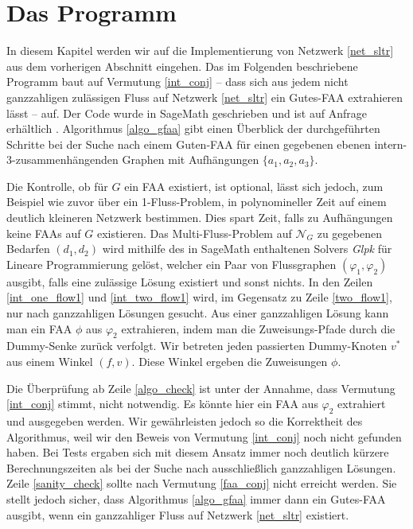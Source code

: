 \chapter{Das Programm}\label{the_program}

In diesem Kapitel werden wir auf die Implementierung von Netzwerk \ref{net_sltr} aus dem vorherigen Abschnitt eingehen. Das im Folgenden beschriebene Programm baut auf Vermutung \ref{int_conj} -- dass sich aus jedem nicht ganzzahligen zulässigen Fluss auf Netzwerk \ref{net_sltr} ein Gutes-FAA extrahieren lässt -- auf. Der Code wurde in SageMath geschrieben und ist auf Anfrage erhältlich \cite{sage}. Algorithmus \ref{algo_gfaa} gibt einen Überblick der durchgeführten Schritte bei der Suche nach einem Guten-FAA für einen gegebenen ebenen intern-3-zusammenhängenden Graphen mit Aufhängungen $\{a_1,a_2,a_3\}$.



Die Kontrolle, ob für $G$ ein FAA existiert, ist optional, lässt sich jedoch, zum Beispiel wie zuvor über ein 1-Fluss-Problem, in polynomineller Zeit auf einem deutlich kleineren Netzwerk bestimmen. Dies spart Zeit, falls zu Aufhängungen keine FAAs auf $G$ existieren. Das Multi-Fluss-Problem auf $\mathcal{N}_G$ zu gegebenen Bedarfen $(d_1,d_2)$ wird mithilfe des in SageMath enthaltenen Solvers \textit{Glpk} für Lineare Programmierung gelöst, welcher ein Paar von Flussgraphen $(\varphi_1,\varphi_2)$ ausgibt, falls eine zulässige Lösung existiert und sonst nichts\cite{glpk,sage}. In den Zeilen \ref{int_one_flow1} und \ref{int_two_flow1} wird, im Gegensatz zu Zeile \ref{two_flow1}, nur nach ganzzahligen Lösungen gesucht. Aus einer ganzzahligen Lösung kann man ein FAA $\phi$ aus $\varphi_2$ extrahieren, indem man die Zuweisungs-Pfade durch die Dummy-Senke zurück verfolgt. Wir betreten jeden passierten Dummy-Knoten $v^*$ aus einem Winkel $(f,v)$. Diese Winkel ergeben die Zuweisungen $\phi$.

Die Überprüfung ab Zeile \ref{algo_check} ist unter der Annahme, dass Vermutung \ref{int_conj} stimmt, nicht notwendig. Es könnte hier ein FAA aus $\varphi_2$ extrahiert und ausgegeben werden. Wir gewährleisten jedoch so die Korrektheit des Algorithmus, weil wir den Beweis von Vermutung \ref{int_conj} noch nicht gefunden haben. Bei Tests ergaben sich mit diesem Ansatz immer noch deutlich kürzere Berechnungszeiten als bei der Suche nach ausschließlich ganzzahligen Lösungen. Zeile \ref{sanity_check} sollte nach Vermutung \ref{faa_conj} nicht erreicht werden. Sie stellt jedoch sicher, dass Algorithmus \ref{algo_gfaa} immer dann ein Gutes-FAA ausgibt, wenn ein ganzzahliger Fluss auf Netzwerk \ref{net_sltr} existiert.

